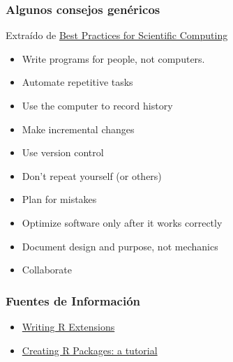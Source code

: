 \documentclass[xcolor={usenames,svgnames,dvipsnames}]{beamer}
\begin{document}
\begin{frame}
\frametitle{Algunos consejos genéricos}
\label{sec-1-3}


Extraído de \href{http://arxiv.org/abs/1210.0530}{Best Practices for Scientific Computing}

\begin{itemize}
\item Write programs for people, not computers.
\item Automate repetitive tasks
\item Use the computer to record history
\item Make incremental changes
\item Use version control
\item Don't repeat yourself (or others)
\item Plan for mistakes
\item Optimize software only after it works correctly
\item Document design and purpose, not mechanics
\item Collaborate
\end{itemize}
\end{frame}
\begin{frame}
\frametitle{Fuentes de Información}
\label{sec-1-4}


\begin{itemize}
\item \href{http://cran.r-project.org/doc/manuals/r-release/R-exts.html}{Writing R Extensions}
\item \href{http://cran.r-project.org/doc/contrib/Leisch-CreatingPackages.pdf}{Creating R Packages: a tutorial}
\end{itemize}
\end{frame}
\end{document}
